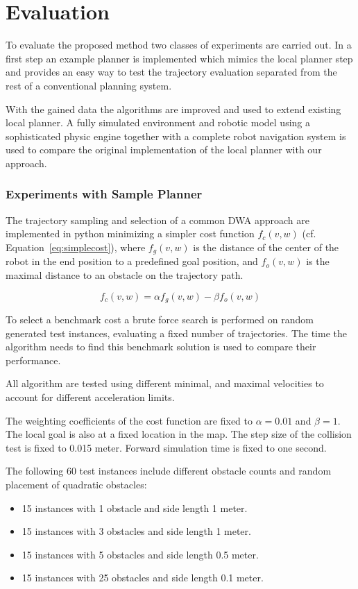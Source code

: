 \chapter{Evaluation}\label{ch:eval}
To evaluate the proposed method two classes of experiments are carried out. In a first step an example planner is implemented which mimics the local planner step and provides an easy way to test the trajectory evaluation separated from the rest of a conventional planning system.

With the gained data the algorithms are improved and used to extend existing local planner. A fully simulated environment and robotic model using a sophisticated physic engine together with a complete robot navigation system is used to compare the original implementation of the local planner with our approach.
 
\subsection{Experiments with Sample Planner}
The trajectory sampling and selection of a common DWA approach are implemented in python minimizing a simpler cost function $f_c(v,w)$ (cf. Equation~\ref{eq:simplecost}), where $f_g(v,w)$ is the distance of the center of the robot in the end position to a predefined goal position, and $f_o(v,w)$ is the maximal distance to an obstacle on the trajectory path.

\begin{equation}
   f_c(v,w)=\alpha f_g(v,w) - \beta f_o(v,w)
   \label{eq:simplecost}
\end{equation}

To select a benchmark cost a brute force search is performed on random generated test instances, evaluating a fixed number of trajectories. 
The time the algorithm needs to find this benchmark solution is used to compare their performance.

All algorithm are tested using different minimal, and maximal velocities to account for different acceleration limits. 

The weighting coefficients of the cost function are fixed to $\alpha=0.01$ and $\beta=1$. The local goal is also at a fixed location in the map. 
The step size of the collision test is fixed to 0.015 meter. 
Forward simulation time is fixed to one second. 

The following 60 test instances include different obstacle counts and random placement of quadratic obstacles:
\begin{itemize}
\item 15 instances with 1 obstacle and side length 1 meter.
\item 15 instances with 3 obstacles and side length 1 meter.
\item 15 instances with 5 obstacles and side length 0.5 meter.
\item 15 instances with 25 obstacles and side length 0.1 meter.
\end{itemize}

